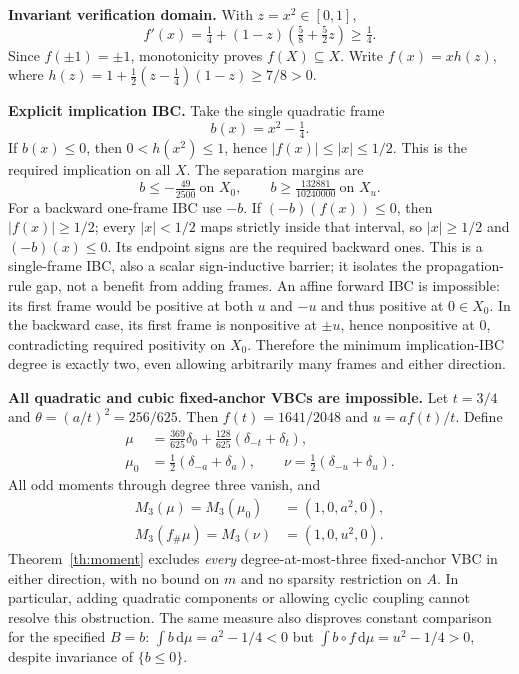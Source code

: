 \documentclass[journal,10pt]{IEEEtran}
\theoremstyle{definition}\newtheorem{definition}{Definition}
\theoremstyle{remark}
\newcommand{\dd}{\,\mathrm d}
\begin{document}
\textbf{Invariant verification domain.} With $z=x^2\in[0,1]$,
\[
 f'(x)=\tfrac14+(1-z)(\tfrac58+\tfrac52z)\geq\tfrac14.
\]
Since $f(\pm1)=\pm1$, monotonicity proves $f(X)\subseteq X$. Write $f(x)=xh(z)$, where $h(z)=1+\tfrac12(z-\tfrac14)(1-z)\geq7/8>0$.

\textbf{Explicit implication IBC.} Take the single quadratic frame
\[
 b(x)=x^2-\tfrac14.
\]
If $b(x)\leq0$, then $0<h(x^2)\leq1$, hence $|f(x)|\leq|x|\leq1/2$. This is the required implication on all $X$. The separation margins are
\[
 b\leq-\tfrac{49}{2500}\ \text{on }X_0,\qquad
 b\geq\tfrac{132881}{10240000}\ \text{on }X_u.
\]
For a backward one-frame IBC use $-b$. If $(-b)(f(x))\leq0$, then $|f(x)|\geq1/2$; every $|x|<1/2$ maps strictly inside that interval, so $|x|\geq1/2$ and $(-b)(x)\leq0$. Its endpoint signs are the required backward ones. This is a single-frame IBC, also a scalar sign-inductive barrier; it isolates the propagation-rule gap, not a benefit from adding frames. An affine forward IBC is impossible: its first frame would be positive at both $u$ and $-u$ and thus positive at $0\in X_0$. In the backward case, its first frame is nonpositive at $\pm u$, hence nonpositive at $0$, contradicting required positivity on $X_0$. Therefore the minimum implication-IBC degree is exactly two, even allowing arbitrarily many frames and either direction.

\textbf{All quadratic and cubic fixed-anchor VBCs are impossible.} Let $t=3/4$ and $\theta=(a/t)^2=256/625$. Then $f(t)=1641/2048$ and $u=af(t)/t$. Define
\begin{align*}
 \mu&=\tfrac{369}{625}\delta_0+\tfrac{128}{625}(\delta_{-t}+\delta_t),\\
 \mu_0&=\tfrac12(\delta_{-a}+\delta_a),\qquad
 \nu=\tfrac12(\delta_{-u}+\delta_u).
\end{align*}
All odd moments through degree three vanish, and
\[
\begin{aligned}
 M_3(\mu)=M_3(\mu_0)&=(1,0,a^2,0),\\
 M_3(f_\#\mu)=M_3(\nu)&=(1,0,u^2,0).
\end{aligned}
\]
Theorem~\ref{th:moment} excludes \emph{every} degree-at-most-three fixed-anchor VBC in either direction, with no bound on $m$ and no sparsity restriction on $A$. In particular, adding quadratic components or allowing cyclic coupling cannot resolve this obstruction. The same measure also disproves constant comparison for the specified $B=b$: $\int b\dd\mu=a^2-1/4<0$ but $\int b\circ f\dd\mu=u^2-1/4>0$, despite invariance of $\{b\leq0\}$.
\end{document}
